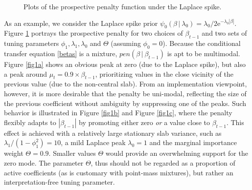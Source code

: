 \documentclass[ba]{imsart}
\numberwithin{equation}{section}
\theoremstyle{plain}
\def\C {\,|\:}
\def\C {\,|\:}
\newcommand{\e}{\mathrm{e}}
\begin{document}
\begin{figure}[!t]
    \caption{Plots of the prospective penalty function under the Laplace spike.}    \label{fig1}
\end{figure}



As an example, we consider the Laplace spike prior $\psi_0(\beta\C\lambda_0)=\lambda_0/2\e^{-\lambda_0|\beta|}$.
Figure \ref{fig1} portrays the prospective penalty for two choices of $\beta_{t-1}$ and two sets of tuning parameters $\phi_1,\lambda_1,\lambda_0$ and $\Theta$ (assuming $\phi_0=0$). 
Because the conditional transfer equation \eqref{betas}  is a mixture, $pen(\beta\C\beta_{t-1})$ is apt to be multimodal.  Figure \ref{fig1a} shows an obvious peak at zero (due to the Laplace spike), but also  a peak around $\mu_t=0.9\times\beta_{t-1}$,  prioritizing values in the close vicinity of the previous value (due to the non-central slab).  From an implementation viewpoint, however, it is more desirable that the penalty be uni-modal, reflecting the size of the previous coefficient without ambiguity by suppressing one of the peaks. Such behavior is illustrated in Figure \ref{fig1b} and Figure \ref{fig1c}, where the  penalty flexibly adapts to $|\beta_{t-1}|$ by promoting  either zero {\sl or} a value close to  $\beta_{t-1}$. This effect is achieved with a relatively large stationary slab variance, such as $\lambda_1/(1-\phi_1^2)=10$, a mild Laplace peak $\lambda_0=1$ and the marginal importance weight  $\Theta=0.9$. Smaller values  $\Theta$ would provide an overwhelming support for the zero mode.  The parameter $\Theta$,  thus should not be regarded as a proportion of active coefficients (as is customary with point-mass mixtures), but rather an interpretation-free tuning parameter. 
\end{document}
